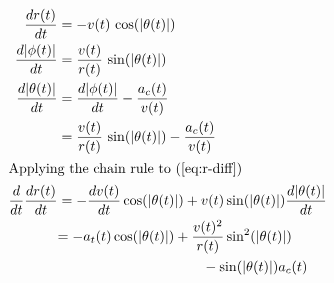 \begin{align}
  \frac{dr(t)}{dt}& = -v(t) \, \cos\paren{\abs{\theta(t)}}\label{eq:r-diff}\\
  \frac{d\abs{\phi(t)}}{dt}& = \frac{v(t)}{r(t)} \, \sin\paren{\abs{\theta(t)}}\label{eq:phi-diff}\\
  \frac{d\abs{\theta(t)}}{dt}& = \frac{d\abs{\phi(t)}}{dt} - \frac{a_c(t)}{v(t)}\\
  &= \frac{v(t)}{r(t)} \, \sin\paren{\abs{\theta(t)}} - \frac{a_c(t)}{v(t)}\label{eq:theta-diff}\\
  \intertext{Applying the chain rule to (\ref{eq:r-diff})}
  \frac{d}{dt} \frac{dr(t)}{dt}& = -\frac{dv(t)}{dt} \cos\paren{\abs{\theta(t)}} + v(t) \sin\paren{\abs{\theta(t)}} \frac{d\abs{\theta(t)}}{dt}\\
  &\begin{aligned}
    = -a_t(t) \cos\paren{\abs{\theta(t)}} &+ \frac{v(t)^2}{r(t)} \sin^2\paren{\abs{\theta(t)}}\\
    &\qquad - \sin\paren{\abs{\theta(t)}} a_c(t) \label{eq:r-diff-2}
  \end{aligned}
\end{align}
